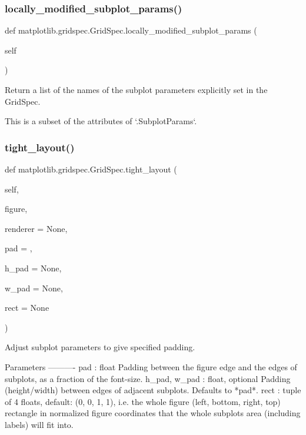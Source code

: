 \subsubsection{\texorpdfstring{locally\+\_\+modified\+\_\+subplot\+\_\+params()}{locally\_modified\_subplot\_params()}}
{\footnotesize\ttfamily def matplotlib.\+gridspec.\+Grid\+Spec.\+locally\+\_\+modified\+\_\+subplot\+\_\+params (\begin{DoxyParamCaption}\item[{}]{self }\end{DoxyParamCaption})}

\begin{DoxyVerb}Return a list of the names of the subplot parameters explicitly set
in the GridSpec.

This is a subset of the attributes of `.SubplotParams`.
\end{DoxyVerb}
 \mbox{\label{classmatplotlib_1_1gridspec_1_1GridSpec_aaa4d91ae963ea777067223fdb7c0dfd1}} 
\subsubsection{\texorpdfstring{tight\+\_\+layout()}{tight\_layout()}}
{\footnotesize\ttfamily def matplotlib.\+gridspec.\+Grid\+Spec.\+tight\+\_\+layout (\begin{DoxyParamCaption}\item[{}]{self,  }\item[{}]{figure,  }\item[{}]{renderer = {\ttfamily None},  }\item[{}]{pad = {},  }\item[{}]{h\+\_\+pad = {\ttfamily None},  }\item[{}]{w\+\_\+pad = {\ttfamily None},  }\item[{}]{rect = {\ttfamily None} }\end{DoxyParamCaption})}

\begin{DoxyVerb}Adjust subplot parameters to give specified padding.

Parameters
----------
pad : float
    Padding between the figure edge and the edges of subplots, as a
    fraction of the font-size.
h_pad, w_pad : float, optional
    Padding (height/width) between edges of adjacent subplots.
    Defaults to *pad*.
rect : tuple of 4 floats, default: (0, 0, 1, 1), i.e. the whole figure
    (left, bottom, right, top) rectangle in normalized figure
    coordinates that the whole subplots area (including labels) will
    fit into.
\end{DoxyVerb}
 \mbox{\label{classmatplotlib_1_1gridspec_1_1GridSpec_a07c6d70d1274f35fc20dc8b5722b7aa6}} 
